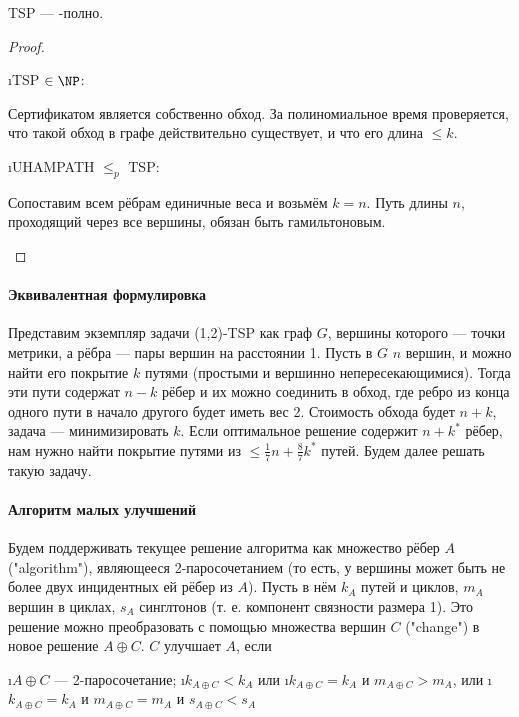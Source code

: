 \begin{theorem}
	TSP --- \NP-полно.
\end{theorem}
\begin{proof}
 $ $\newline
 \begin{itemize}
  \i TSP $\in \NP$\cite{BA09}:
 
  Сертификатом является собственно обход. За полиномиальное время проверяется, что такой обход в графе действительно существует, и что его длина $\le k$.
 
  \i UHAMPATH $\le_p$ TSP:
 
  Сопоставим всем рёбрам единичные веса и возьмём $k = n$. Путь длины $n$, проходящий через все вершины, обязан быть гамильтоновым.
 \end{itemize}
\end{proof}

\paragraph{Эквивалентная формулировка}
Представим экземпляр задачи (1,2)-TSP как граф $G$, вершины которого --- точки метрики, а рёбра --- пары вершин на расстоянии 1. Пусть в $G$ $n$ вершин, и можно найти его покрытие $k$ путями (простыми и вершинно непересекающимися). Тогда эти пути содержат $n-k$ рёбер и их можно соединить в обход, где ребро из конца одного пути в начало другого будет иметь вес 2. Стоимость обхода будет $n+k$, задача --- минимизировать $k$. Если оптимальное решение содержит $n+k^*$ рёбер, нам нужно найти покрытие путями из $\le \frac{1}{7}n+\frac{8}{7}k^*$ путей. Будем далее решать такую задачу.

\paragraph{Алгоритм малых улучшений}
Будем поддерживать текущее решение алгоритма как множество рёбер $A$ ("algorithm"), являющееся 2-паросочетанием (то есть, у вершины может быть не более двух инцидентных ей рёбер из $A$). Пусть в нём $k_A$ путей и циклов, $m_A$ вершин в циклах, $s_A$ синглтонов (т. е. компонент связности размера 1). Это решение можно преобразовать с помощью множества вершин $C$ ("change") в новое решение $A \oplus C$. $C$ улучшает $A$, если 
\begin{enumerate}
	\i $A \oplus C$ --- 2-паросочетание;
	\i $k_{A \oplus C} < k_A$ или
	\i $k_{A \oplus C} = k_A$ и $m_{A \oplus C} > m_A$, или
	\i $k_{A \oplus C} = k_A$ и $m_{A \oplus C} = m_A$ и $s_{A \oplus C} < s_A$
\end{enumerate}

